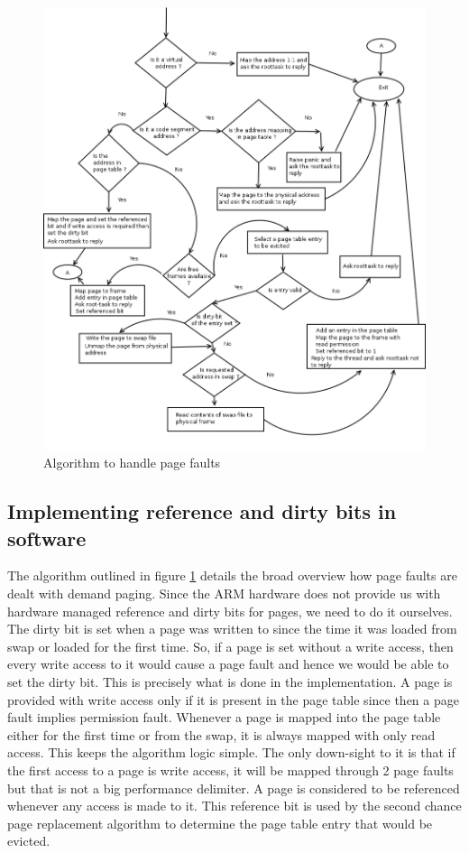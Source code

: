 \documentclass[a4paper, 11pt]{article}
\begin{document}
\begin{figure}
\begin{center}
\includegraphics[scale=0.55]{pagefault.png}
\end{center}
\caption{Algorithm to handle page faults}
\label{pagefault-fig}
\end{figure}

\subsection{Implementing reference and dirty bits in software}
The algorithm outlined in figure \ref{pagefault-fig} details the broad
overview how page faults are dealt with demand paging. Since the ARM
hardware does not provide us with hardware managed reference and dirty
bits for pages, we need to do it ourselves. The dirty bit is set when
a page was written to since the time it was loaded from swap or loaded
for the first time. So, if a page is set without a write access, then
every write access to it would cause a page fault and hence we would
be able to set the dirty bit. This is precisely what is done in the
implementation. A page is provided with write access only if it is
present in the page table since then a page fault implies permission
fault. Whenever a page is mapped into the page table either for the
first time or from the swap, it is always mapped with only read
access. This keeps the algorithm logic simple. The only down-sight to
it is that if the first access to a page is write access, it will be
mapped through 2 page faults but that is not a big performance
delimiter. A page is considered to be referenced whenever any access
is made to it. This reference bit is used by the second chance page
replacement algorithm to determine the page table entry that would be
evicted.
\end{document}
